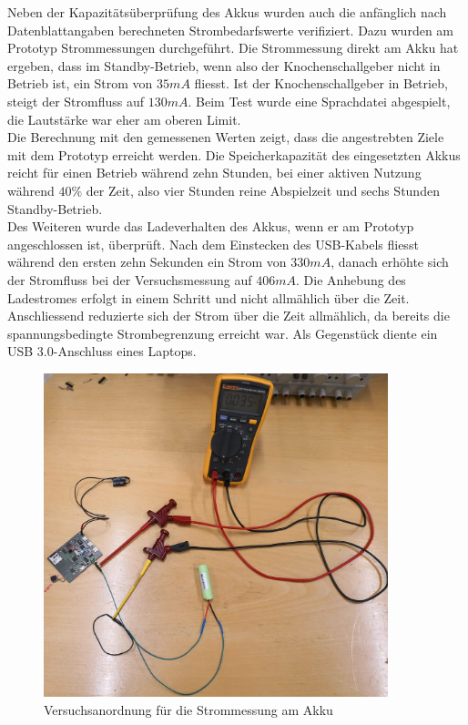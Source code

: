Neben der Kapazitätsüberprüfung des Akkus wurden auch die anfänglich nach Datenblattangaben berechneten Strombedarfswerte verifiziert. Dazu wurden am Prototyp Strommessungen durchgeführt. Die Strommessung direkt am Akku hat ergeben, dass im Standby-Betrieb, wenn also der Knochenschallgeber nicht in Betrieb ist, ein Strom von $35mA$ fliesst. Ist der Knochenschallgeber in Betrieb, steigt der Stromfluss auf $130mA$. Beim Test wurde eine Sprachdatei abgespielt, die Lautstärke war eher am oberen Limit.\\

Die Berechnung mit den gemessenen Werten zeigt, dass die angestrebten Ziele mit dem Prototyp erreicht werden. Die Speicherkapazität des eingesetzten Akkus reicht für einen Betrieb während zehn Stunden, bei einer aktiven Nutzung während $40\%$ der Zeit, also vier Stunden reine Abspielzeit und sechs Stunden Standby-Betrieb.\\

Des Weiteren wurde das Ladeverhalten des Akkus, wenn er am Prototyp angeschlossen ist, überprüft. Nach dem Einstecken des USB-Kabels fliesst während den ersten zehn Sekunden ein Strom von $330mA$, danach erhöhte sich der Stromfluss bei der Versuchsmessung auf $406mA$. Die Anhebung des Ladestromes erfolgt in einem Schritt und nicht allmählich über die Zeit. Anschliessend reduzierte sich der Strom über die Zeit allmählich, da bereits die spannungsbedingte Strombegrenzung erreicht war. Als Gegenstück diente ein USB 3.0-Anschluss eines Laptops.\\


\begin{figure}[htp]
	\centering
	\includegraphics[width=10cm]{Bilder/StrommessungAkku.JPG}
	 \caption{Versuchsanordnung für die Strommessung am Akku}
	 \label{fig:StrommessungAkku}
\end{figure}


